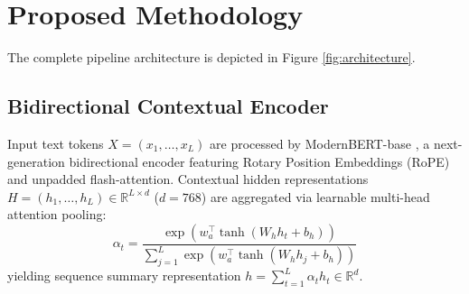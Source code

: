 \documentclass[journal,twocolumn]{article}
\begin{document}
\begin{table}[t]
\centering
\caption{Dataset Partition Breakdown and Class Distributions.}
\label{tab:dataset_splits}
\end{table}

\section{Proposed Methodology}
\label{sec:methodology}

The complete pipeline architecture is depicted in Figure \ref{fig:architecture}.

\subsection{Bidirectional Contextual Encoder}
Input text tokens $X = (x_1, \dots, x_L)$ are processed by ModernBERT-base \cite{modernbert2024}, a next-generation bidirectional encoder featuring Rotary Position Embeddings (RoPE) and unpadded flash-attention. Contextual hidden representations $H = (h_1, \dots, h_L) \in \mathbb{R}^{L \times d}$ ($d = 768$) are aggregated via learnable multi-head attention pooling:
\begin{equation}
    \alpha_t = \frac{\exp(w_a^\top \tanh(W_h h_t + b_h))}{\sum_{j=1}^L \exp(w_a^\top \tanh(W_h h_j + b_h))}
\end{equation}
yielding sequence summary representation $h = \sum_{t=1}^L \alpha_t h_t \in \mathbb{R}^d$.
\end{document}
